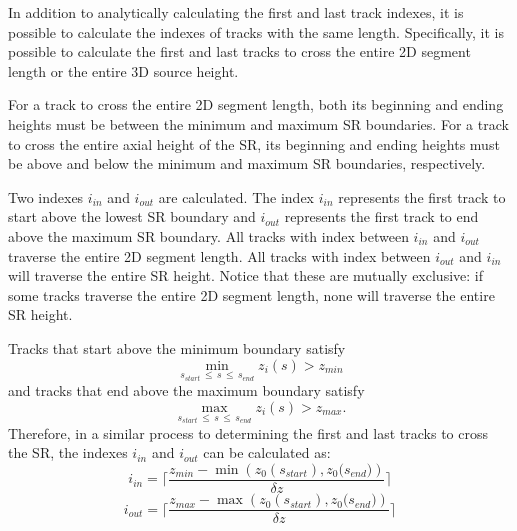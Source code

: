 \begin{appendices}
In addition to analytically calculating the first and last track indexes, it is possible to calculate the indexes of tracks with the same length. Specifically, it is possible to calculate the first and last tracks to cross the entire 2D segment length or the entire 3D source height.

For a track to cross the entire 2D segment length, both its beginning and ending heights must be between the minimum and maximum \ac{SR} boundaries. For a track to cross the entire axial height of the \ac{SR}, its beginning and ending heights must be above and below the minimum and maximum \ac{SR} boundaries, respectively.

Two indexes $i_{\textit{in}}$ and $i_{\textit{out}}$ are calculated. The index $i_{\textit{in}}$ represents the first track to start above the lowest \ac{SR} boundary and $i_{\textit{out}}$ represents the first track to end above the maximum \ac{SR} boundary. All tracks with index between $i_{\textit{in}}$ and $i_{\textit{out}}$ traverse the entire 2D segment length. All tracks with index between $i_{\textit{out}}$ and $i_{\textit{in}}$ will traverse the entire \ac{SR} height. Notice that these are mutually exclusive: if some tracks traverse the entire 2D segment length, none will traverse the entire \ac{SR} height.

Tracks that start above the minimum boundary satisfy
\begin{equation}
\min_{s_{\textit{start}} \, \leq \, s \, \leq \, s_{\textit{end}}} z_i(s) > z_{\textit{min}}
\end{equation}
and tracks that end above the maximum boundary satisfy
\begin{equation}
\max_{s_{\textit{start}} \, \leq \, s \, \leq \, s_{\textit{end}}} z_i(s) > z_{\textit{max}}.
\end{equation}
Therefore, in a similar process to determining the first and last tracks to cross the \ac{SR}, the indexes $i_{\textit{in}}$ and $i_{\textit{out}}$ can be calculated as:
\begin{equation}
i_{\textit{in}} = \Bigg\lceil\frac{z_{\textit{min}} - \min\left({z_0(s_{\textit{start}}), z_0(s_{\textit{end}}})\right) }{\delta z}\Bigg\rceil
\end{equation}
\begin{equation}
i_{\textit{out}} = \Bigg\lceil\frac{z_{\textit{max}} - \max\left({z_0(s_{\textit{start}}), z_0(s_{\textit{end}}})\right) }{\delta z}\Bigg\rceil
\end{equation}

\end{appendices}

